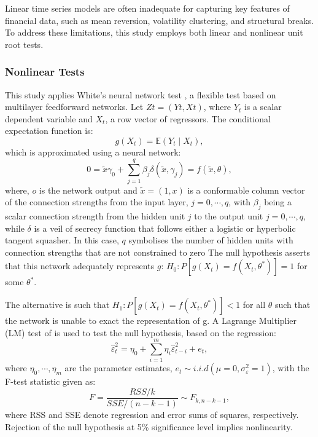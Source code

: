 \documentclass[a4paper]{article}
\theoremstyle{plain}
\theoremstyle{definition}
\theoremstyle{remark}
\begin{document}
Linear time series models are often inadequate for capturing key features of financial data, such as mean reversion, volatility clustering, and structural breaks. To address these limitations, this study employs both linear and nonlinear unit root tests.

\subsubsection{Nonlinear Tests}\label{Nonlinear}
This study applies White’s neural network test \citep{white1998additional, Makatjane2017Application}, a flexible test based on multilayer feedforward networks. Let $Zt=(Yt,Xt)$, where $Y_t$ is a scalar dependent variable and $X_t$, a row vector of regressors. The conditional expectation function is:
\begin{equation}
g(X_t) = \mathbb{E}(Y_t \mid X_t),
\end{equation}
which is approximated using a neural network:
\begin{equation}
0 = \tilde{x} \gamma_0 + \sum_{j=1}^{q} \beta_j \delta(\tilde{x}, \gamma_j) = f(\tilde{x}, \theta),
\end{equation}
where, $o$ is the network output and $\tilde{x}=\left( 1,x\right)$ is a conformable column vector of the connection strengths from the input layer, $j=0, \cdots, q$, with $\beta_{j}$ being a scalar connection strength from the hidden unit $j$ to the output unit $j=0, \cdots, q$, while $\delta$ is
a veil of secrecy function that follows either a logistic or hyperbolic tangent squasher. In this case, $q$ symbolises the number of hidden units with connection strengths that are not constrained to zero The null hypothesis asserts that this network adequately represents $g$:
$H_{0}: P\left[ g\left( X_t \right) = f\left( X_t, \theta^{\ast} \right)\right]=1$ for some $\theta^{\ast}$.

The alternative is such that $H_{1}: P\left[ g\left( X_t \right) = f\left( X_t, \theta^{\ast} \right)\right]<1$ for all $\theta$ such that the network is unable to exact the representation of g. A Lagrange Multiplier (LM) test of \cite{engle1982autoregressive} is used to test the null hypothesis, based on the regression:
\begin{equation}\label{eq:lm}
\hat{\varepsilon}^2_t = \eta_0 + \sum_{i=1}^{m} \eta_i \hat{\varepsilon}^2_{t-i} + e_t,
\end{equation}
where $\eta_{0}, \cdots, \eta_{m}$ are the parameter estimates, $e_t \sim i.i.d \left( \mu =0, \sigma^{2}_{\varepsilon} =1\right) $,
with the F-test statistic given as:
\begin{equation}\label{eq:fstat}
F = \frac{RSS/k}{SSE/(n-k-1)} \sim F_{k,n-k-1},
\end{equation}
where RSS and SSE denote regression and error sums of squares, respectively. Rejection of the null hypothesis at 5\% significance level implies nonlinearity.
\end{document}

